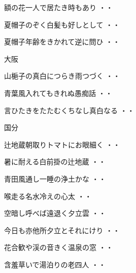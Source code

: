\begin{shiika}額の花一人で居たき時もあり
\hfill{・・}\end{shiika}
\begin{shiika}夏帽子のぞく白髪も好しとして
\hfill{・・}\end{shiika}
\begin{shiika}夏帽子年齢をきかれて逆に問ひ
\hfill{・・}\end{shiika}
\vspace{0.4cm}
大阪
\begin{shiika}山梔子の真白につらき雨つづく
\hfill{・・}\end{shiika}
\begin{shiika}青葉風入れてもきれぬ愚痴話
\hfill{・・}\end{shiika}
\begin{shiika}言ひたきをたたむくちなし真白なる
\hfill{・・}\end{shiika}
\vspace{0.4cm}
国分
\begin{shiika}辻地蔵朝取りトマトにお眼細く
\hfill{・・}\end{shiika}
\begin{shiika}暑に耐える白前掛の辻地蔵
\hfill{・・}\end{shiika}
\begin{shiika}青田風通し一睡の浄土かな
\hfill{・・}\end{shiika}
\begin{shiika}喉走る名水冷えの心太
\hfill{・・}\end{shiika}
\begin{shiika}空暗し呼べば遠退く夕立雲
\hfill{・・}\end{shiika}
\begin{shiika}今日も亦他所夕立とそれにけり
\hfill{・・}\end{shiika}
\begin{shiika}花合歓や渓の音きく温泉の窓
\hfill{・・}\end{shiika}
\begin{shiika}含羞草いで湯泊りの老四人
\hfill{・・}\end{shiika}
